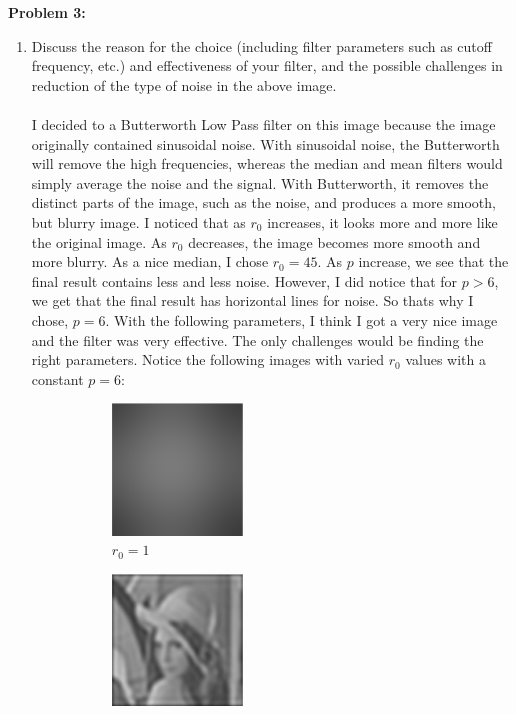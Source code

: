 \documentclass[11pt]{article}
\newenvironment{problem}[1]{\textbf{Problem #1: }}{\newpage}
\begin{document}
\begin{problem}{3}
\begin{enumerate}[label = (\alph*)]
\begin{figure}[h!]
\begin{subfigure}[h!]{.4\textwidth}
					\caption{Resized to Original $f_{flt}$}
				\end{subfigure}
			\end{figure}
			\newpage
			\item Discuss the reason for the choice (including filter parameters such as cutoff frequency, etc.) and effectiveness of your filter, and the possible challenges in reduction of the type of noise in the above image.
			\\ \\
			I decided to a Butterworth Low Pass filter on this image because the image originally contained sinusoidal noise.  With sinusoidal noise, the Butterworth will remove the high frequencies, whereas the median and mean filters would simply average the noise and the signal.  With Butterworth, it removes the distinct parts of the image, such as the noise, and produces a more smooth, but blurry image. I noticed that as $r_0$ increases, it looks more and more like the original image.  As $r_0$ decreases, the image becomes more smooth and more blurry. As a nice median, I chose $r_0 = 45$.  As $p$ increase, we see that the final result contains less and less noise. However, I did notice that for $p > 6$, we get that the final result has horizontal lines for noise.  So thats why I chose, $p = 6$. With the following parameters, I think I got a very nice image and the filter was very effective.  The only challenges would be finding the right parameters. 
			\newpage
			Notice the following images with varied $r_0$ values with a constant $p = 6$:
			\\
			\begin{figure}[h!]
				\centering
				\begin{subfigure}{.3 \textwidth}
					\centering
					\includegraphics[height = 3.5cm]{Figures/Prob3/r01}
					\caption{$r_0 = 1$}
				\end{subfigure}
				\begin{subfigure}{.3 \textwidth}
					\centering
					\includegraphics[height = 3.5cm]{Figures/Prob3/r020}

\end{subfigure}
\end{figure}
\end{enumerate}
\end{problem}
\end{document}

